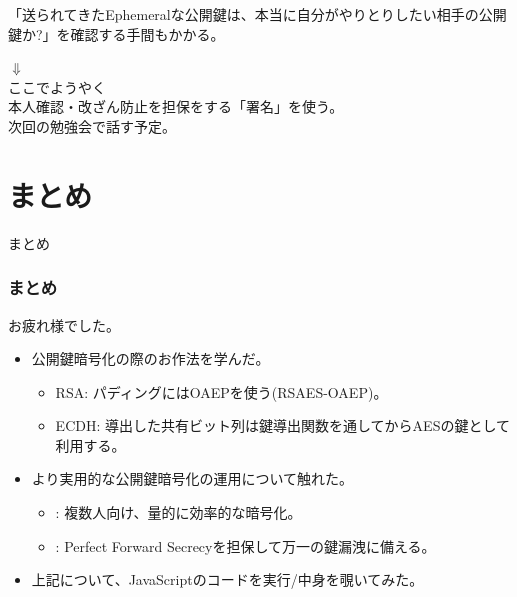 \documentclass[12pt,dvipdfmx]{beamer}
\begin{document}
\begin{frame}
\begin{block}{}
「送られてきたEphemeralな公開鍵は、本当に自分がやりとりしたい相手の公開鍵か?」を確認する手間もかかる。
\end{block}
\begin{center}
 $\Downarrow$\\
ここでようやく\\
\alert{本人確認・改ざん防止を担保をする「署名」を使う}。\\
次回の勉強会で話す予定。
\end{center}

\end{frame}

\section{まとめ}
\begin{frame}
 \centering
 {\Large まとめ}
\end{frame}

\begin{frame}
\frametitle{まとめ}
お疲れ様でした。

\begin{itemize}
\item 公開鍵暗号化の際のお作法を学んだ。
\begin{itemize}
 \item RSA: パディングには\alert{OAEPを使う(RSAES-OAEP)}。
 \item ECDH: 導出した共有ビット列は\alert{鍵導出関数を通してから}AESの鍵として利用する。
\end{itemize}
\item より実用的な公開鍵暗号化の運用について触れた。
\begin{itemize}
 \item {}: 複数人向け、量的に効率的な暗号化。
 \item {}: Perfect Forward Secrecyを担保して万一の鍵漏洩に備える。
\end{itemize}
\item 上記について、JavaScriptのコードを実行/中身を覗いてみた。
\end{itemize}
\end{frame}
\end{document}
